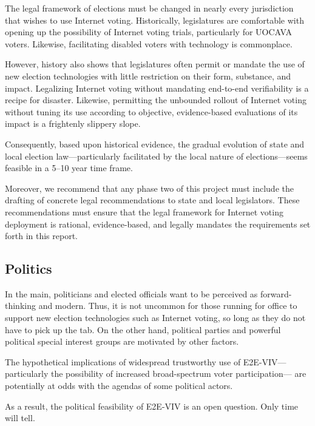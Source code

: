 The legal framework of elections must be changed in nearly every
jurisdiction that wishes to use Internet voting.  Historically,
legislatures are comfortable with opening up the possibility of
Internet voting trials, particularly for UOCAVA voters.  Likewise,
facilitating disabled voters with technology is commonplace.

However, history also shows that legislatures often permit or mandate
the use of new election technologies with little restriction on their
form, substance, and impact.  Legalizing Internet voting without
mandating end-to-end verifiability is a recipe for disaster.
Likewise, permitting the unbounded rollout of Internet voting without
tuning its use according to objective, evidence-based evaluations of
its impact is a frightenly slippery slope.

Consequently, based upon historical evidence, the gradual evolution of
state and local election law---particularly facilitated by the local
nature of elections---seems feasible in a 5--10 year time frame.

Moreover, we recommend that any phase two of this project must include
the drafting of concrete legal recommendations to state and local
legislators.  These recommendations must ensure that the legal
framework for Internet voting deployment is rational, evidence-based,
and legally mandates the requirements set forth in this report.

\subsection{Politics}

In the main, politicians and elected officials want to be perceived as
forward-thinking and modern.  Thus, it is not uncommon for those
running for office to support new election technologies such as
Internet voting, so long as they do not have to pick up the tab.  On
the other hand, political parties and powerful political special
interest groups are motivated by other factors.

The hypothetical implications of widespread trustworthy use of
E2E-VIV---particularly the possibility of increased broad-spectrum
voter participation--- are potentially at odds with the agendas of
some political actors.

As a result, the political feasibility of E2E-VIV is an open question.
Only time will tell.

